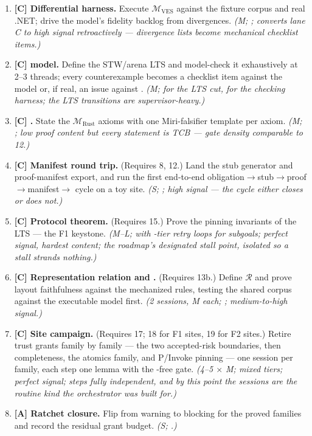 \begin{enumerate}[leftmargin=2.2em, itemsep=0.35em]
{  until 14 exists --- definitions compile whether or not they are
  faithful, so supervisor review concentrates on statements.)}
\item \textbf{[C] Differential harness.} Execute
  $\mathcal{M}_{\mathrm{VES}}$ against the fixture corpus and real
  .NET; drive the model's fidelity backlog from divergences.
  \emph{(M; ; converts lane C to high signal
  retroactively --- divergence lists become mechanical checklist
  items.)}
\item \textbf{[C]  model.} Define the STW/arena LTS
  and model-check it exhaustively at 2--3 threads; every
  counterexample becomes a checklist item against the model or, if
  real, an issue against \dotnetrs{}.
  \emph{(M;  for the LTS cut,  for the
  checking harness; the LTS transitions are supervisor-heavy.)}
\item \textbf{[C] .} State the
  $\mathcal{M}_{\mathrm{Rust}}$ axioms with one Miri-falsifier
  template per axiom.
  \emph{(M; ; low proof content but every statement is
  TCB --- gate density comparable to 12.)}
\item \textbf{[C] Manifest round trip.} (Requires 8, 12.) Land the
  stub generator and proof-manifest export, and run the first
  end-to-end obligation$\to$stub$\to$proof$\to$manifest$\to$%
   cycle on a toy site.
  \emph{(S; ; high signal --- the cycle either closes
  or does not.)}
\item \textbf{[C] Protocol theorem.} (Requires 15.) Prove the pinning
  invariants of the LTS --- the F1 keystone.
  \emph{(M--L;  with -tier retry loops for
  subgoals; perfect signal, hardest content; the roadmap's designated
  stall point, isolated so a stall strands nothing.)}
\item \textbf{[C] Representation relation and
  .} (Requires 13b.) Define $\mathcal{R}$ and
  prove layout faithfulness against the mechanized 
  rules, testing the shared corpus against the executable model first.
  \emph{(2 sessions, M each; ; medium-to-high signal.)}
\item \textbf{[C] Site campaign.} (Requires 17; 18 for F1 sites, 19
  for F2 sites.) Retire trust grants family by family --- the two
  accepted-risk boundaries, then  completeness, the
  atomics family, and P/Invoke pinning --- one session per family,
  each step one lemma with the -free gate.
  \emph{(4--5 $\times$ M; mixed tiers; perfect signal; steps fully
  independent, and by this point the sessions are the routine kind
  the orchestrator was built for.)}
\item \textbf{[A] Ratchet closure.} Flip  from
  warning to blocking for the proved families and record the residual
  grant budget.
  \emph{(S; .)}
\end{enumerate}


